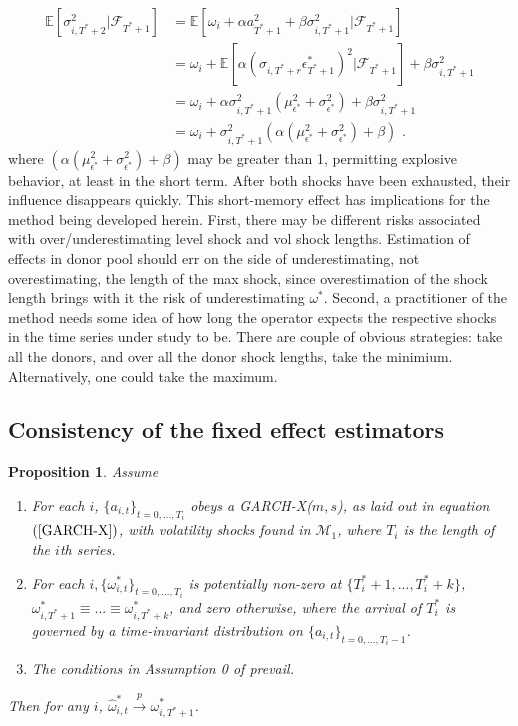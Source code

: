 \documentclass[11pt,3p,review,authoryear]{elsarticle}
\def\mc#1{\mathcal{#1}} %
\def\mc#1{\mathcal{#1}}
\newtheorem{prop}{Proposition}
\theoremstyle{definition}
\begin{document}
\begin{align*}
\mathbb{E}[ \sigma^{2}_{i,T^{*}+2} |\mathcal{F}_{T^{*}+1}] & = \mathbb{E}[\omega_{i} + \alpha a_{T^{*}+1}^{2} + \beta\sigma^{2}_{i,T^{*}+1} |\mathcal{F}_{T^{*}+1}] \\
& = \omega_{i} + \mathbb{E}[\alpha(\sigma_{i,T^{*}+r}\epsilon^{*}_{T^{*}+1})^{2} |\mathcal{F}_{T^{*}+1}] + \beta\sigma^{2}_{i,T^{*}+1} \\
& = \omega_{i} + \alpha\sigma^{2}_{i,T^{*}+1}(\mu^{2}_{\epsilon^{*}} + \sigma^{2}_{\epsilon^{*}}) + \beta\sigma^{2}_{i,T^{*}+1} \\
& = \omega_{i} + \sigma^{2}_{i,T^{*}+1}(\alpha(\mu^{2}_{\epsilon^{*}} + \sigma^{2}_{\epsilon^{*}}) + \beta)\text{ .}
\end{align*}
where $(\alpha(\mu^{2}_{\epsilon^{*}} + \sigma^{2}_{\epsilon^{*}}) + \beta)$ may be greater than 1, permitting explosive behavior, at least in the short term.  After both shocks have been exhausted, their influence disappears quickly.  This short-memory effect has implications for the method being developed herein.  First, there may be different risks associated with over/underestimating level shock and vol shock lengths.  Estimation of effects in donor pool should err on the side of underestimating, not overestimating, the length of the max shock, since overestimation of the shock length brings with it the risk of underestimating $\omega^{*}$.  Second, a practitioner of the method needs some idea of how long the operator expects the respective shocks in the time series under study to be.  There are couple of obvious strategies: take all the donors, and over all the donor shock lengths, take the minimium.  Alternatively, one could take the maximum.


\subsection{Consistency of the fixed effect estimators}

\begin{prop}\label{omega_consistency}
Assume
\begin{enumerate}
  \item For each $i$, $\{a_{i,t}\}_{t=0,...,T_i}$ obeys a GARCH-X($m,s$), as laid out in equation $(\ref{GARCH-X})$, with volatility shocks found in $\mc{M}_{1}$, where $T_i$ is the length of the $i$th series.
  \item For each $i, \{\omega_{i,t}^{*}\}_{t=0,...,T_i}$ is potentially non-zero at $\{T^{*}_{i}+1,... ,T^{*}_{i}+k\}$, $\omega_{i,T^{*}+1}^{*}\equiv...\equiv\omega_{i,T^{*}+k}^{*}$, and zero otherwise, where the arrival of $T_{i}^{*}$ is governed by a time-invariant distribution on $\{a_{i,t}\}_{t=0,...,T_i-1}$. \label{stationarity_of_omega_i_t}
  \item The conditions in Assumption 0 of \citet{han2014asymptotic} prevail.
\end{enumerate}
Then for any $i$, $\hat\omega_{i,t}^{*} \xrightarrow{p} \omega_{i,T^{*}+1}^{*}$.
\end{prop}
\end{document}
